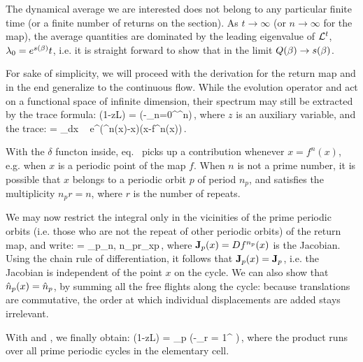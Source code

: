 The dynamical average we are interested does not belong to any 
particular finite time (or a finite number of returns on the section). As
$t\to\infty$ (or $n\to\infty$ for the map), the average quantities are
dominated by the leading eigenvalue of ${\cal L}^t$, $\lambda_0 =
e^{s(\beta)}t$, i.e. it is straight forward to show that in the
limit $Q(\beta) \to s(\beta)$.

For sake of simplicity, we will proceed with the derivation for the
return map and in the end generalize to the continuous flow. While the
evolution operator  and  act on a
functional space of infinite dimension, their spectrum may still be
extracted by the trace formula:
\beq
\det(1-z{\cal L}) =
\exp\left(-\sum_{n=0}^{\infty}^n\right)\,,
\label{eq-det-disc-def}
\eeq
where $z$ is an auxiliary variable, and the trace:
\beq
{} = \int_{\pS}dx ~
e^{\beta\cdot(^n(x)-x)}\delta(x-f^n(x))\,.
\label{eq-trace-disc}
\eeq

With the $\delta$ functon inside, eq.~ picks up a
contribution whenever $x = f^n(x)$, e.g. when $x$ is a periodic point
of the map $f$. When $n$ is not a prime number, it is possible that
$x$ belongs to a periodic orbit $p$ of period $n_p$, and satisfies the
multiplicity $n_p r = n$, where $r$ is the number of repeats.

We may now restrict the integral only in the vicinities of the prime
periodic orbits (i.e. those who are not the repeat of other periodic
orbits) of the return map, and write:
\beq
{} = \sum_p\delta_{n,
n_pr}\sum_{x\in p}\,,
\label{eq-trace-expan}
\eeq 
where ${\bf J}_p(x) = Df^{n_p}(x)$ is the Jacobian. Using the chain 
rule of differentiation, it follows that ${\bf J}_p(x) = {\bf J}_p $, 
i.e. the Jacobian is independent of the point $x$ on the cycle. We 
can also show that $\hat{n}_p(x) = \hat{n}_p$, by summing all the free 
flights along the cycle: because translations are commutative, the 
order at which individual displacements are added stays irrelevant.

With  and , we finally
obtain:
\beq
\det(1-z{\cal L}) = \prod_p \exp\left(-\sum_{r =
1}^{\infty}
\right)\,,
\label{eq-det-disc}
\eeq
where the product runs over all prime periodic cycles in the 
elementary cell.

